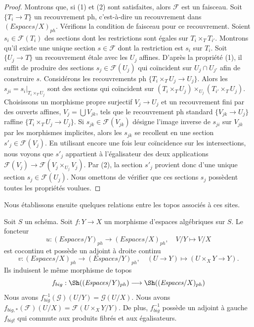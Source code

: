 \begin{proof}
Montrons que, si (1) et (2) sont satisfaites, alors $\mathcal{F}$ est un faisceau.
Soit $\{T_i \to T\}$ un recouvrement ph, c'est-à-dire un recouvrement dans
$(\textit{Espaces}/X)_{ph}$.
Vérifions la condition de faisceau pour ce recouvrement.
Soient $s_i \in \mathcal{F}(T_i)$ des sections dont les restrictions sont égales
sur $T_i \times_T T_{i'}$. Montrons qu'il existe une
unique section $s \in \mathcal{F}$ dont la restriction est $s_i$ sur $T_i$.
Soit $\{U_j \to T\}$ un recouvrement \'etale avec les $U_j$ affines.
D'après la propriété (1), il suffit de produire des sections $s_j \in \mathcal{F}(U_j)$
qui coïncident sur $U_j \cap U_{j'}$ afin de construire $s$.
Considérons les recouvrements ph $\{T_i \times_T U_j \to U_j\}$.
Alors les $s_{ji} = s_i|_{T_i \times_T U_j}$ sont des sections qui coïncident
sur $(T_i \times_T U_j) \times_{U_j} (T_{i'} \times_T U_j)$.
Choisissons un morphisme propre surjectif $V_j \to U_j$ et un recouvrement
fini par des ouverts affines, $V_j = \bigcup V_{jk}$, tels que le recouvrement ph standard
$\{V_{jk} \to U_j\}$ raffine $\{T_i \times_T U_j \to U_j\}$.
Si $s_{jk} \in \mathcal{F}(V_{jk})$
désigne l'image inverse de $s_{ji}$ sur $V_{jk}$ par les
morphismes implicites, alors les $s_{jk}$ se recollent en une section
$s'_j \in \mathcal{F}(V_j)$. En utilisant encore une fois leur coïncidence sur les intersections,
nous voyons que $s'_j$ appartient à l'égalisateur des deux
applications $\mathcal{F}(V_j) \to \mathcal{F}(V_j \times_{U_j} V_j)$.
Par (2), la section $s'_j$ provient donc d'une unique section
$s_j \in \mathcal{F}(U_j)$. Nous omettons de vérifier que ces
sections $s_j$ possèdent toutes les propriétés voulues.
\end{proof}

\noindent
Nous établissons ensuite quelques relations entre les topos
associés à ces sites.

\begin{lemma}
\label{lemma-morphism-big-ph}
Soit $S$ un schéma.
Soit $f : Y \to X$ un morphisme d'espaces algébriques sur $S$.
Le foncteur
$$
u : (\textit{Espaces}/Y)_{ph} \longrightarrow (\textit{Espaces}/X)_{ph},
\quad
V/Y \longmapsto V/X
$$
est cocontinu et possède un adjoint à droite continu
$$
v : (\textit{Espaces}/X)_{ph} \longrightarrow (\textit{Espaces}/Y)_{ph},
\quad
(U \to Y) \longmapsto (U \times_X Y \to Y).
$$
Ils induisent le même morphisme de topos
$$
f_{big} :
\Sh((\textit{Espaces}/Y)_{ph})
\longrightarrow
\Sh((\textit{Espaces}/X)_{ph})
$$
Nous avons $f_{big}^{-1}(\mathcal{G})(U/Y) = \mathcal{G}(U/X)$.
Nous avons $f_{big, *}(\mathcal{F})(U/X) = \mathcal{F}(U \times_X Y/Y)$.
De plus, $f_{big}^{-1}$ possède un adjoint à gauche $f_{big!}$ qui commute aux
produits fibrés et aux égalisateurs.
\end{lemma}


